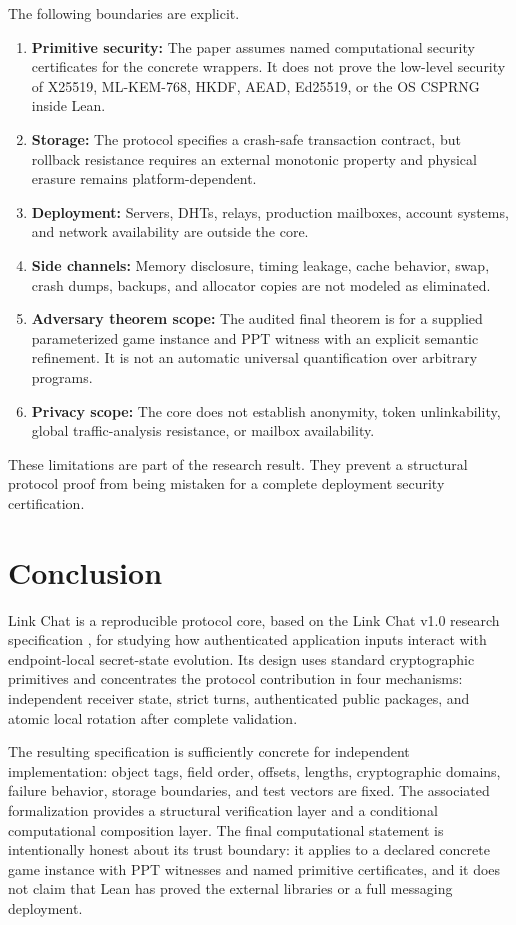 \documentclass[11pt,letterpaper]{article}
\begin{document}
The following boundaries are explicit.
\begin{enumerate}[leftmargin=*]
  \item \textbf{Primitive security:} The paper assumes named computational security
        certificates for the concrete wrappers. It does not prove the low-level security
        of X25519, ML-KEM-768, HKDF, AEAD, Ed25519, or the OS CSPRNG inside Lean.
  \item \textbf{Storage:} The protocol specifies a crash-safe transaction contract, but
        rollback resistance requires an external monotonic property and physical erasure
        remains platform-dependent.
  \item \textbf{Deployment:} Servers, DHTs, relays, production mailboxes, account
        systems, and network availability are outside the core.
  \item \textbf{Side channels:} Memory disclosure, timing leakage, cache behavior,
        swap, crash dumps, backups, and allocator copies are not modeled as eliminated.
  \item \textbf{Adversary theorem scope:} The audited final theorem is for a supplied
        parameterized game instance and PPT witness with an explicit semantic refinement.
        It is not an automatic universal quantification over arbitrary programs.
  \item \textbf{Privacy scope:} The core does not establish anonymity, token unlinkability,
        global traffic-analysis resistance, or mailbox availability.
\end{enumerate}

These limitations are part of the research result. They prevent a structural protocol proof
from being mistaken for a complete deployment security certification.

\section{Conclusion}
\label{sec:conclusion}

Link Chat is a reproducible protocol core, based on the Link Chat v1.0 research
specification \cite{linkchat-spec}, for studying how authenticated application
inputs interact with endpoint-local secret-state evolution. Its design uses standard
cryptographic primitives and concentrates the protocol contribution in four mechanisms:
independent receiver state, strict turns, authenticated public packages, and atomic local
rotation after complete validation.

The resulting specification is sufficiently concrete for independent implementation:
object tags, field order, offsets, lengths, cryptographic domains, failure behavior,
storage boundaries, and test vectors are fixed. The associated formalization provides a
structural verification layer and a conditional computational composition layer. The final
computational statement is intentionally honest about its trust boundary: it applies to a
declared concrete game instance with PPT witnesses and named primitive certificates, and it
does not claim that Lean has proved the external libraries or a full messaging deployment.
\end{document}
